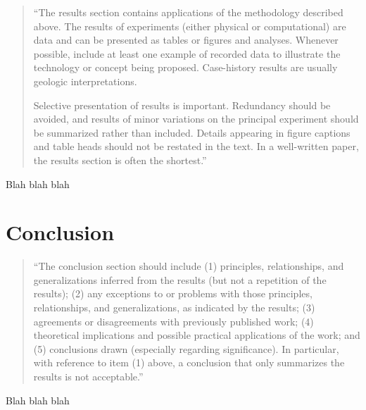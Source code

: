 \documentclass[]{report}   %
\begin{document}
\begin{quotation}
	``The results section contains applications of the methodology described above. The results of experiments
	(either physical or computational) are data and can be presented as tables or figures and analyses. Whenever
	possible, include at least one example of recorded data to illustrate the technology or concept being proposed.
	Case-history results are usually geologic interpretations.

	Selective presentation of results is important. Redundancy should be avoided, and results of minor variations on
	the principal experiment should be summarized rather than included. Details appearing in figure captions and
	table heads should not be restated in the text. In a well-written paper, the results section is often the
	shortest.''
\end{quotation}


Blah blah blah





\chapter{Conclusion}		%

\begin{quotation}
	``The conclusion section should include (1) principles, relationships, and generalizations inferred from the
	results (but not a repetition of the results); (2) any exceptions to or problems with those principles,
	relationships, and generalizations, as indicated by the results; (3) agreements or disagreements with previously
	published work; (4) theoretical implications and possible practical applications of the work; and (5) conclusions
	drawn (especially regarding significance). In particular, with reference to item (1) above, a conclusion that
	only summarizes the results is not acceptable.''
\end{quotation}


Blah blah blah






\begin{thebibliography}{9}
\end{thebibliography}
\end{document}
